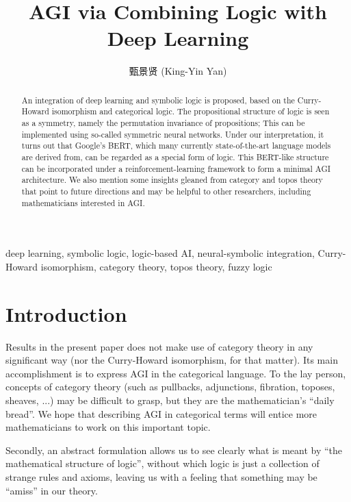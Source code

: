 \documentclass[orivec]{llncs}
\title{AGI via Combining Logic with Deep Learning}
\author{
甄景贤 (King-Yin Yan) 
}
\institute{General.Intelligence@Gmail.com}
\begin{document}
\maketitle

\setlength{\parindent}{0em}
\setlength{\parskip}{2.8ex plus0.8ex minus0.8ex}

\begin{abstract}
An integration of deep learning and symbolic logic is proposed, based on the Curry-Howard isomorphism and categorical logic.  The propositional structure of logic is seen as a symmetry, namely the permutation invariance of propositions;  This can be implemented using so-called symmetric neural networks.  Under our interpretation, it turns out that Google's BERT, which many currently state-of-the-art language models are derived from, can be regarded as a special form of logic.  This BERT-like structure can be incorporated under a reinforcement-learning framework to form a minimal AGI architecture.  We also mention some insights gleaned from category and topos theory that point to future directions and may be helpful to other researchers, including mathematicians interested in AGI.
\end{abstract}

\begin{keywords}
deep learning, symbolic logic, logic-based AI, neural-symbolic integration, Curry-Howard isomorphism, category theory, topos theory, fuzzy logic
\end{keywords}

\setcounter{section}{-1}
\section{Introduction}
\label{sec:0}

Results in the present paper does not make use of category theory in any significant way (nor the Curry-Howard isomorphism, for that matter).  Its main accomplishment is to express AGI in the categorical language.  To the lay person, concepts of category theory (such as pullbacks, adjunctions, fibration, toposes, sheaves, ...) may be difficult to grasp, but they are the mathematician's ``daily bread''.  We hope that describing AGI in categorical terms will entice more mathematicians to work on this important topic.

Secondly, an abstract formulation allows us to see clearly what is meant by ``the mathematical structure of logic'', without which logic is just a collection of strange rules and axioms, leaving us with a feeling that something may be ``amiss'' in our theory.
\end{document}

